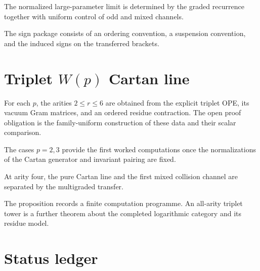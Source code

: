 \begin{corollary}
\label{cor:super-yangian-tline-asymptotic}
\ClaimStatusOpen
The normalized large-parameter limit is determined by the graded
recurrence together with uniform control of odd and mixed channels.
\end{corollary}

\begin{remark}
\label{rem:super-yangian-fermionic-sign-open}
The sign package consists of an ordering convention, a suspension
convention, and the induced signs on the transferred brackets.
\end{remark}

\section{Triplet \(W(p)\) Cartan line}
\label{sec:wp-triplet-cartan-shadow}

\begin{proposition}
\label{prop:wp-cartan-shadow-through-r6}
\ClaimStatusOpen
For each \(p\), the arities \(2\le r\le6\) are obtained from the
explicit triplet OPE, its vacuum Gram matrices, and an ordered residue
contraction.  The open proof obligation is the family-uniform
construction of these data and their scalar comparison.
\end{proposition}

\begin{remark}
\label{rem:wp-cartan-values-p2-p3}
The cases \(p=2,3\) provide the first worked computations once the
normalizations of the Cartan generator and invariant pairing are
fixed.
\end{remark}

\begin{remark}
\label{rem:wp-cross-channel-quartic}
At arity four, the pure Cartan line and the first mixed collision
channel are separated by the multigraded transfer.
\end{remark}

\begin{remark}[Scope]
\label{rem:wp-scope-honesty}
The proposition records a finite computation programme.  An all-arity
triplet tower is a further theorem about the completed logarithmic
category and its residue model.
\end{remark}

\section{Status ledger}
\label{sec:class-m-closed-form-summary}


